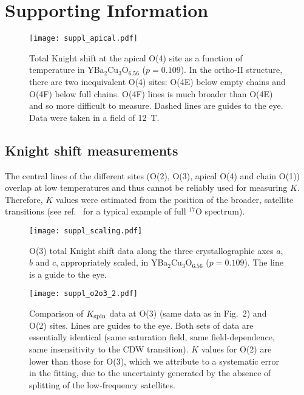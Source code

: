 \documentclass[superscriptaddress,twocolumn,prl,preprintnumbers,amsmath,amssymb]{revtex4}
\begin{document}


\clearpage
\newpage

\section{Supporting Information}



\renewcommand\thefigure{S\arabic{figure}}
\setcounter{figure}{0}


\renewcommand\theequation{S\arabic{equation}}
\setcounter{equation}{0}


\begin{figure}[b!]%
\centerline{\texttt{[image: suppl\_apical.pdf]}} %
 \caption{Total Knight shift at the apical O(4) site as a function of temperature in YBa$_2$Cu$_3$O$_{6.56}$ ($p=0.109$). In the ortho-II structure, there are two inequivalent O(4) sites: O(4E) below empty chains and O(4F) below full chains. O(4F) lines is much broader than O(4E) and so more difficult to measure. Dashed lines are guides to the eye. Data were taken in a field of 12~T.}
 \renewcommand{\figurename}{S1}
 \label{suppl_apical}
\end{figure}


\subsection*{\bf Knight shift measurements}

The central lines of the different sites (O(2), O(3), apical O(4) and chain O(1)) overlap at low temperatures and thus cannot be reliably used for measuring $K$. Therefore, $K$ values were estimated from the position of the broader, satellite transitions (see ref.~\cite{Zhou17} for a typical example of full $^{17}$O spectrum).



\begin{figure}[t!]%
\centerline{\texttt{[image: suppl\_scaling.pdf]}} %
 \caption{O(3) total Knight shift data along the three crystallographic axes $a$, $b$ and $c$, appropriately scaled, in YBa$_2$Cu$_3$O$_{6.56}$ ($p=0.109$). The line is a guide to the eye.}
 \label{suppl_scaling}
\end{figure}

\begin{figure*}[t!]%
\centerline{\texttt{[image: suppl\_o2o3\_2.pdf]}} %
 \caption{Comparison of $K_{\rm spin}$ data at O(3) (same data as in Fig.~2) and O(2) sites. Lines are guides to the eye. Both sets of data are essentially identical (same saturation field, same field-dependence, same insensitivity to the CDW transition). $K$ values for O(2) are lower than those for O(3), which we attribute to a systematic error in the fitting, due to the uncertainty generated by the absence of splitting of the low-frequency satellites. }
 \label{suppl_o2o3}
\end{figure*}
\end{document}
